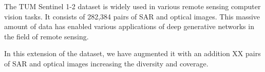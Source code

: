 The TUM Sentinel 1-2 dataset is widely used in various remote sensing computer vision tasks. It consists of 282,384 pairs of SAR and optical images. This massive amount of data has enabled various applications of deep generative networks in the field of remote sensing\cite{Zhang2023}.

In this extension of the dataset, we have augmented it with an addition XX pairs of SAR and optical images increasing the diversity and coverage.